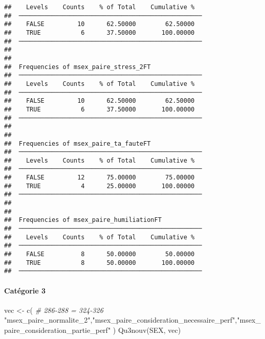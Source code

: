 \documentclass[
]{article}
\newenvironment{Shaded}{\begin{snugshade}}{\end{snugshade}}
\newcommand{\CommentTok}[1]{\textcolor[rgb]{0.56,0.35,0.01}{\textit{#1}}}
\newcommand{\FunctionTok}[1]{\textcolor[rgb]{0.00,0.00,0.00}{#1}}
\newcommand{\NormalTok}[1]{#1}
\newcommand{\OtherTok}[1]{\textcolor[rgb]{0.56,0.35,0.01}{#1}}
\newcommand{\StringTok}[1]{\textcolor[rgb]{0.31,0.60,0.02}{#1}}
\begin{document}
\begin{verbatim}
##    Levels    Counts    % of Total    Cumulative %   
##  ────────────────────────────────────────────────── 
##    FALSE         10      62.50000        62.50000   
##    TRUE           6      37.50000       100.00000   
##  ────────────────────────────────────────────────── 
## 
## 
##  Frequencies of msex_paire_stress_2FT               
##  ────────────────────────────────────────────────── 
##    Levels    Counts    % of Total    Cumulative %   
##  ────────────────────────────────────────────────── 
##    FALSE         10      62.50000        62.50000   
##    TRUE           6      37.50000       100.00000   
##  ────────────────────────────────────────────────── 
## 
## 
##  Frequencies of msex_paire_ta_fauteFT               
##  ────────────────────────────────────────────────── 
##    Levels    Counts    % of Total    Cumulative %   
##  ────────────────────────────────────────────────── 
##    FALSE         12      75.00000        75.00000   
##    TRUE           4      25.00000       100.00000   
##  ────────────────────────────────────────────────── 
## 
## 
##  Frequencies of msex_paire_humiliationFT            
##  ────────────────────────────────────────────────── 
##    Levels    Counts    % of Total    Cumulative %   
##  ────────────────────────────────────────────────── 
##    FALSE          8      50.00000        50.00000   
##    TRUE           8      50.00000       100.00000   
##  ──────────────────────────────────────────────────
\end{verbatim}

\hypertarget{catuxe9gorie-3-3}{%
\paragraph{Catégorie 3}\label{catuxe9gorie-3-3}}

\begin{Shaded}
\begin{Highlighting}[]
\NormalTok{vec }\OtherTok{\textless{}{-}} \FunctionTok{c}\NormalTok{(  }\CommentTok{\# 286{-}288 = 324{-}326}
  \StringTok{"msex\_paire\_normalite\_2"}\NormalTok{,}\StringTok{"msex\_paire\_consideration\_necessaire\_perf"}\NormalTok{,}\StringTok{"msex\_paire\_consideration\_partie\_perf"}
\NormalTok{)}
\FunctionTok{Qu3nouv}\NormalTok{(SEX, vec)}
\end{Highlighting}
\end{Shaded}
\end{document}

